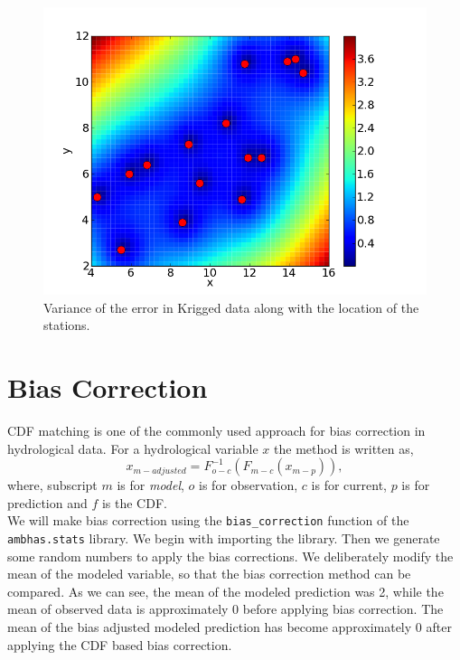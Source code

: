 \documentclass[10pt]{book}
\begin{document}
\beforefig
\begin{figure}[h!]
  \centering
    \includegraphics[scale=0.5]{images/krige_12.png}
  \caption{Variance of the error in Krigged data along with the location of the stations.}
   \label{fig:krige_12}
\end{figure}
\afterfig

\section{Bias Correction}
CDF matching is one of the commonly used approach for bias correction in hydrological data. For a hydrological variable $x$ the method is written as,
\begin{equation}
x_{m-adjusted} = F^{-1}_{o-c}\left(F_{m-c} \left(x_{m-p} \right) \right),
\end{equation}
where, subscript $m$ is for \emph{model}, $o$ is for observation, $c$ is for current, $p$ is for prediction and $f$ is the CDF. \\

We will make bias correction using the \verb"bias_correction" function of the \verb"ambhas.stats" library. We begin with importing the library. Then we generate some random numbers to apply the bias corrections. We deliberately modify the mean of the modeled variable, so that the bias correction method can be compared. As we can see, the mean of the modeled prediction was 2, while the mean of observed data is approximately 0 before applying bias correction. The mean of the bias adjusted modeled prediction has become approximately 0 after applying the CDF based bias correction. \\
\end{document}
